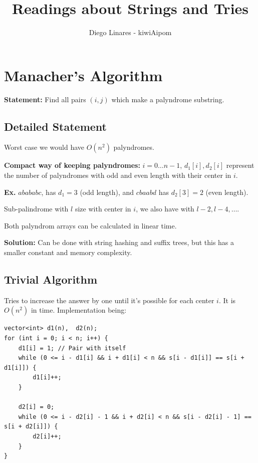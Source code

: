 \documentclass{IEEEtran}
\title{Readings about Strings and Tries}
\author{Diego Linares - kiwiAipom}
\begin{document}
  \maketitle
  \section{Manacher's Algorithm}
    \textbf{Statement:} Find all pairs $(i,j)$ which make a palyndrome substring.
    \subsection{Detailed Statement}
      Worst case we would have $O(n^2)$ palyndromes.\par 
      \textbf{Compact way of keeping palyndromes:} $i = 0\ldots n-1$, $d_1[i],d_2[i]$ represent the number of palyndromes with odd and even length with their center in $i$.\par 
      \textbf{Ex.} $abababc$, has $d_1=3$ (odd length), and $cbaabd$ has $d_2[3] = 2$ (even length). \par 
      Sub-palindrome with $l$ size with center in $i$, we also have with $l-2, l-4,\ldots$. \par 
      Both palyndrom arrays can be calculated in linear time. \par 
      \textbf{Solution:} Can be done with string hashing and suffix trees, but this has a smaller constant and memory complexity.
    \subsection{Trivial Algorithm}
      Tries to increase the answer by one until it's possible for each center $i$. It is $O(n^2)$ in time. Implementation being:
      \begin{lstlisting}
vector<int> d1(n),  d2(n);
for (int i = 0; i < n; i++) {
    d1[i] = 1; // Pair with itself 
    while (0 <= i - d1[i] && i + d1[i] < n && s[i - d1[i]] == s[i + d1[i]]) {
        d1[i]++;
    }

    d2[i] = 0;
    while (0 <= i - d2[i] - 1 && i + d2[i] < n && s[i - d2[i] - 1] == s[i + d2[i]]) {
        d2[i]++;
    }
}
      \end{lstlisting}
\end{document}
